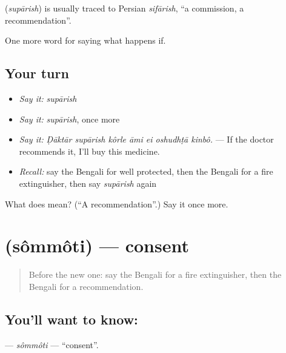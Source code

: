 \begin{cousinweb}
\textbf{} (\emph{supārish}) is usually traced to Persian \emph{sifārish}, \textquotedblleft{}a commission, a recommendation\textquotedblright{}.
\end{cousinweb}

\begin{grammarlens}[title={What you've built}]
One more word for saying what happens if.
\end{grammarlens}

\subsection*{Your turn}
\begin{itemize}
\raggedright
  \item \emph{Say it:} \emph{supārish}
  \item \emph{Say it:} \emph{supārish}, once more
  \item \emph{Say it:} \emph{Ḍāktār supārish kôrle āmi ei oshudhṭā kinbô.} — If the doctor recommends it, I'll buy this medicine.
  \item \emph{Recall:} say the Bengali for well protected, then the Bengali for a fire extinguisher, then say \emph{supārish} again
\end{itemize}

\begin{tcolorbox}[breakable,colback=teal!4,colframe=teal!35!black,title={Before you move on}]
What does  mean? (\textquotedblleft{}A recommendation\textquotedblright{}.) Say it once more.
\end{tcolorbox}
\section[\texorpdfstring{\bn{সম্মতি} (sômmôti)}{সম্মতি (sômmôti)}]{ (sômmôti) — consent}

\label{lesson:BN-C536-sommoti}



\begin{quote}
Before the new one: say the Bengali for a fire extinguisher, then the Bengali for a recommendation.
\end{quote}

\subsection*{You'll want to know: }
\textbf{} — \emph{sômmôti} — \textquotedblleft{}consent\textquotedblright{}.

